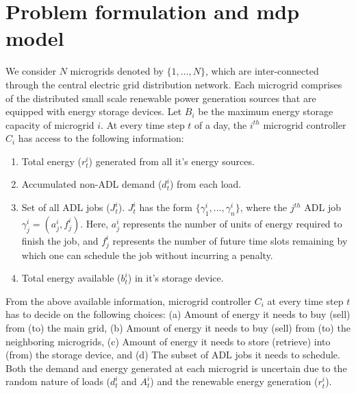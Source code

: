 \section{Problem formulation and mdp model} \label{sec:model}
We consider $N$ microgrids denoted by $\{1,\ldots,N\}$, which are inter-connected through the central electric grid distribution network. Each microgrid comprises of the distributed small scale renewable power generation sources that are equipped with energy storage devices. Let $B_i$ be the maximum energy storage capacity of microgrid $i$. At every time step $t$ of a day, the $i^{th}$ microgrid controller $C_i$ has access to the following information:
\begin{enumerate}[label=(\alph*)]
\item Total energy ($r_t^i$) generated from all it's energy sources.
\item Accumulated non-ADL demand ($d_t^i$) from each load. 
\item Set of all ADL jobs ($J_{t}^{i}$). $J_{t}^{i}$ has the form $\{\gamma_{1}^{i},\ldots,\gamma_{n}^{i}\}$, where the $j^{th}$ ADL job $\gamma_{j}^{i} = (a_{j}^{i}, f_{j}^{i})$. Here, $a_{j}^{i}$ represents the number of units of energy required to finish the job, and  $f_{j}^{i}$ represents the number of future time slots remaining by which one can schedule the job without incurring a penalty.
\item  Total energy available ($b_{t}^{i}$) in it's storage device.
\end{enumerate} 
From the above available information, microgrid controller  $C_i$ at every time step $t$ has to decide on the following choices: (a)  Amount of energy it needs to buy (sell) from (to) the main grid, (b) Amount of energy it needs to buy (sell) from (to) the neighboring microgrids,
(c) Amount of energy it needs to store (retrieve) into (from) the storage device, and (d) The subset of ADL jobs it needs to schedule. Both the demand and energy generated at each microgrid is uncertain due to the random nature of loads ($d_t^i$ and $A_t^i$) and the renewable energy generation ($r_t^i$). 

